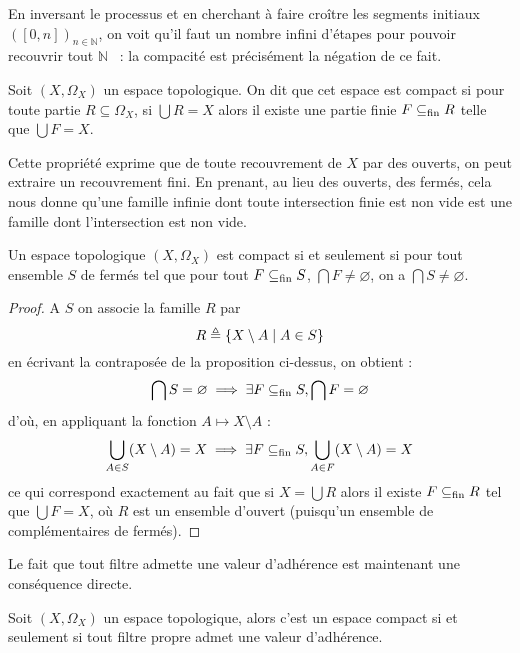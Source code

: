 En inversant le processus et en cherchant à faire croître les segments
initiaux $([0,n])_{n\in\mathbb N}$, on voit qu'il faut un nombre infini d'étapes
pour pouvoir recouvrir tout $\mathbb N$~ : la compacité est précisément la
négation de ce fait.

\begin{definition}[Compacité]
  Soit $(X,\Omega_X)$ un espace topologique. On dit que cet espace est compact
  si pour toute partie $R\subseteq \Omega_X$, si $\bigcup R = X$ alors il existe
  une partie finie $F\subseteq_{\mathrm{fin}} R$ telle que $\bigcup F = X$.
\end{definition}

Cette propriété exprime que de toute recouvrement de $X$ par des ouverts, on
peut extraire un recouvrement fini. En prenant, au lieu des ouverts, des fermés,
cela nous donne qu'une famille infinie dont toute intersection finie est non
vide est une famille dont l'intersection est non vide.

\begin{property}
  Un espace topologique $(X,\Omega_X)$ est compact si et seulement si pour tout
  ensemble $S$ de fermés tel que pour tout $F\subseteq_{\mathrm{fin}} S$,
  $\bigcap F \neq\varnothing$,
  on a $\bigcap S \neq\varnothing$.
\end{property}

\begin{proof}
  A $S$ on associe la famille $R$ par
  \[R \triangleq \{X\setminus A\mid A \in S\}\]
  en écrivant la contraposée de la proposition ci-dessus, on obtient :
  \[\bigcap S =\varnothing\implies \exists F\subseteq_{\mathrm{fin}} S, \bigcap F = \varnothing\]
  d'où, en appliquant la fonction $A \mapsto X\setminus A$ :
  \[\bigcup_{A \in S}(X\setminus A) = X\implies
  \exists F\subseteq_{\mathrm{fin}} S, \bigcup_{A\in F}(X\setminus A) = X\]
  ce qui correspond exactement au fait que si $X = \bigcup R$ alors il existe
  $F\subseteq_{\mathrm{fin}} R$ tel que $\bigcup F = X$, où $R$ est un ensemble d'ouvert
  (puisqu'un ensemble de complémentaires de fermés).
\end{proof}

Le fait que tout filtre admette une valeur d'adhérence est maintenant une
conséquence directe.

\begin{proposition}
  Soit $(X,\Omega_X)$ un espace topologique, alors c'est un espace compact si
  et seulement si tout filtre propre admet une valeur d'adhérence.
\end{proposition}

